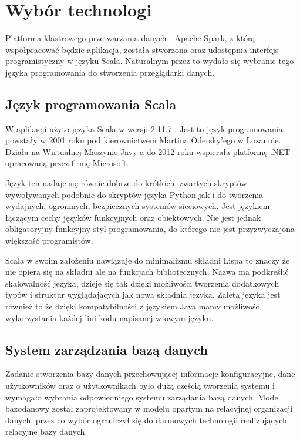 \documentclass[a4paper,12pt,twoside]{article}
\begin{document}
\newpage
\section{Wybór technologi}

Platforma klastrowego przetwarzania danych - Apache Spark\cite{spark}, z którą współpracować będzie aplikacja, została stworzona oraz udostępnia interfejs programistyczny w języku Scala.
Naturalnym przez to wydało się wybranie tego języka programowania do stworzenia przeglądarki danych.

  
\subsection{Język programowania Scala}
W aplikacji użyto języka Scala w wersji 2.11.7 \cite{jezykScala}. Jest to język programowania powstały w 2001 roku pod kierownictwem Martina Odersky'ego w Lozannie.
Działa na Wirtualnej Maszynie Javy a do 2012 roku wspierała platformę .NET opracowaną przez firmę Microsoft. 

Język ten nadaje się równie dobrze do krótkich, zwartych skryptów  wywoływanych podobnie do skryptów języka Python jak i do tworzenia wydajnych, ogromnych, bezpiecznych systemów sieciowych.
Jest językiem łączącym cechy języków funkcyjnych oraz obiektowych. 
Nie jest jednak obligatoryjny funkcyjny styl programowania, do którego nie jest przyzwyczajona większość programistów.

 Scala w swoim założeniu nawiązuje do minimalizmu składni Lispa to znaczy że nie opiera się na składni ale na funkcjach bibliotecznych. Nazwa ma podkreślić skalowalność języka, dzieje się tak dzięki możliwości tworzenia dodatkowych typów i struktur wyglądających jak nowa składnia języka.
Zaletą języka jest również to że dzięki kompatybilności z językiem Java mamy możliwość wykorzystania każdej lini kodu napisanej w owym języku.

\subsection{System zarządzania bazą danych}  
Zadanie stworzenia bazy danych przechowującej informacje konfiguracyjne, dane użytkowników oraz o użytkownikach było dużą częścią tworzenia systemu i
wymagało wybrania odpowiedniego systemu zarządania bazą danych.
Model bazodanowy został zaprojektowany w modelu opartym na relacyjnej organizacji danych, przez co wybór ograniczył się do
darmowych technologii realizujących relacyjne bazy danych.
\end{document}
